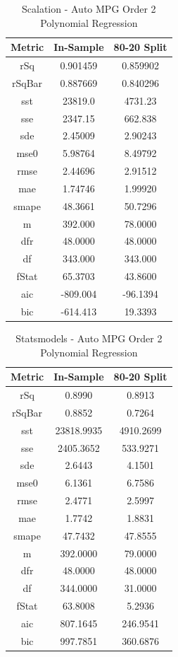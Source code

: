 \documentclass{article}
\begin{document}
\begin{table}[H]
\centering
\caption{Scalation - Auto MPG Order 2 Polynomial Regression}
\label{tab:Scalation - Auto MPG Order 2 Polynomial Regression}
\begin{tabular}{|c|c|c|} \hline 
Metric & In-Sample & 80-20 Split \\ \hline \hline 
rSq &0.901459 & 0.859902 \\ \hline 
rSqBar &0.887669 &      0.840296 \\ \hline 
sst &23819.0 &  4731.23 \\ \hline 
sse &2347.15 &  662.838 \\ \hline 
sde &2.45009 &  2.90243 \\ \hline 
mse0 &5.98764 & 8.49792 \\ \hline 
rmse &2.44696 & 2.91512 \\ \hline 
mae &1.74746 &  1.99920 \\ \hline 
smape &48.3661 &        50.7296 \\ \hline 
m &392.000 &    78.0000 \\ \hline 
dfr &48.0000 &  48.0000 \\ \hline 
df &343.000 &   343.000 \\ \hline 
fStat &65.3703 &        43.8600 \\ \hline 
aic &-809.004 & -96.1394 \\ \hline 
bic &-614.413 & 19.3393 \\ \hline 
\end{tabular}
\end{table}

\begin{table}[H]
\centering
\caption{Statsmodels - Auto MPG Order 2 Polynomial Regression}
\label{tab:Statsmodels - Auto MPG Order 2 Polynomial Regression}
\begin{tabular}{|c|c|c|}\hline
Metric & In-Sample & 80-20 Split \\ \hline \hline
rSq & 0.8990 & 0.8913 \\ \hline
rSqBar & 0.8852 & 0.7264 \\ \hline
sst & 23818.9935 & 4910.2699 \\ \hline
sse & 2405.3652 & 533.9271 \\ \hline
sde & 2.6443 & 4.1501 \\ \hline
mse0 & 6.1361 & 6.7586 \\ \hline
rmse & 2.4771 & 2.5997 \\ \hline
mae & 1.7742 & 1.8831 \\ \hline
smape & 47.7432 & 47.8555 \\ \hline
m & 392.0000 & 79.0000 \\ \hline
dfr & 48.0000 & 48.0000 \\ \hline
df & 344.0000 & 31.0000 \\ \hline
fStat & 63.8008 & 5.2936 \\ \hline
aic & 807.1645 & 246.9541 \\ \hline
bic & 997.7851 & 360.6876 \\ \hline
\end{tabular}
\end{table}
\end{document}
